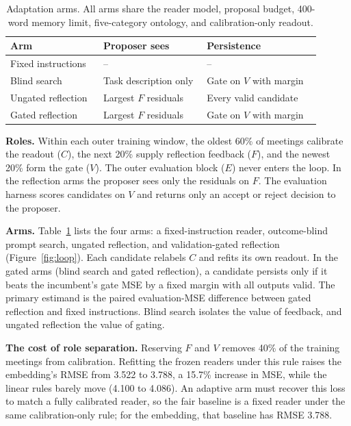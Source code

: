 \documentclass[sigconf]{acmart}
\begin{document}
\begin{table}[t]
\caption{Adaptation arms. All arms share the reader model, proposal budget, 400-word memory limit, five-category ontology, and calibration-only readout.}
\label{tab:arms}
\small
\begin{tabular}{@{}p{0.27\linewidth}p{0.3\linewidth}p{0.33\linewidth}@{}}
\toprule
Arm & Proposer sees & Persistence \\
\midrule
Fixed instructions & -- & -- \\
Blind search & Task description only & Gate on $V$ with margin \\
Ungated reflection & Largest $F$ residuals & Every valid candidate \\
Gated reflection & Largest $F$ residuals & Gate on $V$ with margin \\
\bottomrule
\end{tabular}
\end{table}

\textbf{Roles.} Within each outer training window, the oldest 60\% of meetings calibrate the readout ($C$), the next 20\% supply reflection feedback ($F$), and the newest 20\% form the gate ($V$). The outer evaluation block ($E$) never enters the loop. In the reflection arms the proposer sees only the residuals on $F$. The evaluation harness scores candidates on $V$ and returns only an accept or reject decision to the proposer.

\textbf{Arms.} Table~\ref{tab:arms} lists the four arms: a fixed-instruction reader, outcome-blind prompt search, ungated reflection, and validation-gated reflection (Figure~\ref{fig:loop}). Each candidate relabels $C$ and refits its own readout. In the gated arms (blind search and gated reflection), a candidate persists only if it beats the incumbent's gate MSE by a fixed margin with all outputs valid. The primary estimand is the paired evaluation-MSE difference between gated reflection and fixed instructions. Blind search isolates the value of feedback, and ungated reflection the value of gating.

\textbf{The cost of role separation.} Reserving $F$ and $V$ removes 40\% of the training meetings from calibration. Refitting the frozen readers under this rule raises the embedding's RMSE from 3.522 to 3.788, a 15.7\% increase in MSE, while the linear rules barely move (4.100 to 4.086). An adaptive arm must recover this loss to match a fully calibrated reader, so the fair baseline is a fixed reader under the same calibration-only rule; for the embedding, that baseline has RMSE 3.788.
\end{document}
